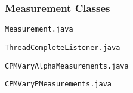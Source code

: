 \documentclass[a4paper,12pt]{article}
\newcommand*{\MyPath}{/Users/MichaelChiang/Dropbox/Edinburgh/Courses/Year 3/SH_Project/cell_potts_model}%
\begin{document}
\subsubsection{Measurement Classes}

\noindent\texttt{Measurement.java}

\vspace*{0.5cm}
\noindent\texttt{ThreadCompleteListener.java}

\vspace*{0.5cm}
\noindent\texttt{CPMVaryAlphaMeasurements.java}

\vspace*{0.5cm}
\noindent\texttt{CPMVaryPMeasurements.java}

\end{document}
